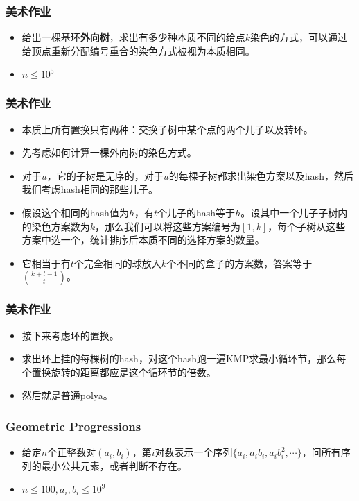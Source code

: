 \documentclass{beamer}
\begin{document}
\begin{frame}
    \frametitle{美术作业}
    \begin{itemize}
        \item 给出一棵基环\textbf{外向树}，求出有多少种本质不同的给点$k$染色的方式，可以通过给顶点重新分配编号重合的染色方式被视为本质相同。
        \item $n\leq 10^5$
    \end{itemize}
\end{frame}

\begin{frame}
    \frametitle{美术作业}
    \begin{itemize}
        \item 本质上所有置换只有两种：交换子树中某个点的两个儿子以及转环。
        \item 先考虑如何计算一棵外向树的染色方式。
        \item 对于$u$，它的子树是无序的，对于$u$的每棵子树都求出染色方案以及hash，然后我们考虑hash相同的那些儿子。
        \item 假设这个相同的hash值为$h$，有$t$个儿子的hash等于$h$。设其中一个儿子子树内的染色方案数为$k$，那么我们可以将这些方案编号为$[1, k]$，每个子树从这些方案中选一个，统计排序后本质不同的选择方案的数量。
        \item 它相当于有$t$个完全相同的球放入$k$个不同的盒子的方案数，答案等于${k + t - 1\choose t}$。
    \end{itemize}
\end{frame}

\begin{frame}
    \frametitle{美术作业}
    \begin{itemize}
        \item 接下来考虑环的置换。
        \item 求出环上挂的每棵树的hash，对这个hash跑一遍KMP求最小循环节，那么每个置换旋转的距离都应是这个循环节的倍数。
        \item 然后就是普通polya。
    \end{itemize}
\end{frame}

\begin{frame}
    \frametitle{Geometric Progressions}
    \begin{itemize}
        \item 给定$n$个正整数对$(a_i, b_i)$，第$i$对数表示一个序列$\{a_i, a_ib_i, a_ib_i^2, \cdots \}$，问所有序列的最小公共元素，或者判断不存在。
        \item $n\leq 100, a_i, b_i\leq 10^9$
    \end{itemize}
\end{frame}
\end{document}

